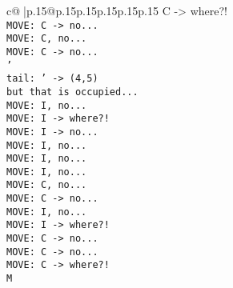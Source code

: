 \documentclass{article}
\begin{document}
{\begin{supertabular}{c@{$\;$}|p{.15\linewidth}@{}p{.15\linewidth}p{.15\linewidth}p{.15\linewidth}p{.15\linewidth}p{.15\linewidth}}
{{{C -> where?!\\ \tt  MOVE: C -> no...\\ \tt  MOVE: C, no...\\ \tt  MOVE: C -> no...\\ \tt  '\\ \tt tail: ' -> (4,5) \\ \tt  but that is occupied...\\ \tt  MOVE: I, no...\\ \tt  MOVE: I -> where?!\\ \tt  MOVE: I -> no...\\ \tt  MOVE: I, no...\\ \tt  MOVE: I, no...\\ \tt  MOVE: I, no...\\ \tt  MOVE: C, no...\\ \tt  MOVE: C -> no...\\ \tt  MOVE: I, no...\\ \tt  MOVE: I -> where?!\\ \tt  MOVE: C -> no...\\ \tt  MOVE: C -> no...\\ \tt  MOVE: C -> where?!\\ \tt  M}}}
\end{supertabular}}
\end{document}
